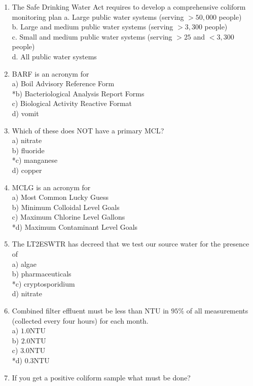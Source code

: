 \begin{enumerate}
\item The Safe Drinking Water Act requires to develop a comprehensive coliform monitoring plan a. Large public water systems (serving $>50,000$ people)\\
b. Large and medium public water systems (serving $>3,300$ people)\\
c. Small and medium public water systems (serving $>25$ and $<3,300$ people)\\
d. All public water systems 
 \item BARF is an acronym for\\
a) Boil Advisory Reference Form\\
*b) Bacteriological Analysis Report Forms\\
c) Biological Activity Reactive Format\\
d) vomit\\
  \item Which of these does NOT have a primary MCL?\\
a) nitrate\\
b) fluoride\\
*c) manganese\\
d) copper\\
  \item MCLG is an acronym for\\
a) Most Common Lucky Guess\\
b) Minimum Colloidal Level Goals\\
c) Maximum Chlorine Level Gallons\\
*d) Maximum Contaminant Level Goals\\
  \item The LT2ESWTR has decreed that we test our source water for the presence of\\
a) algae\\
b) pharmaceuticals\\
*c) cryptosporidium\\
d) nitrate\\
  \item Combined filter effluent must be less than NTU in $95 \%$ of all measurements (collected every four hours) for each month.\\
a) $1.0 \mathrm{NTU}$\\
b) $2.0 \mathrm{NTU}$\\
c) $3.0 \mathrm{NTU}$\\
*d) $0.3 \mathrm{NTU}$\\
  \item If you get a positive coliform sample what must be done?\\


\end{enumerate}
